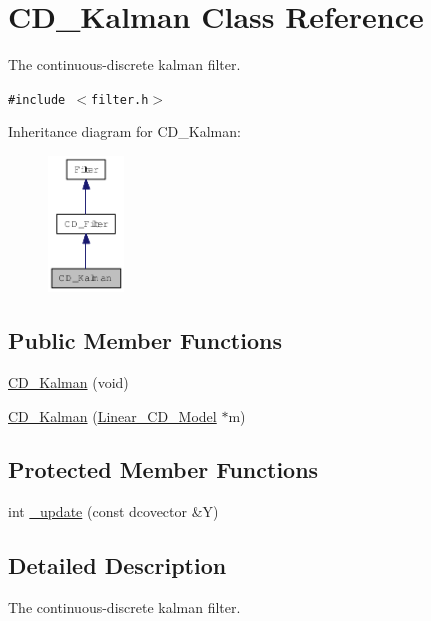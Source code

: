 \hypertarget{class_c_d___kalman}{
\section{CD\_\-Kalman Class Reference}
\label{class_c_d___kalman}
}
The continuous-discrete kalman filter.  


{\tt \#include $<$filter.h$>$}

Inheritance diagram for CD\_\-Kalman:\nopagebreak
\begin{figure}[H]
\begin{center}
\leavevmode
\includegraphics[width=57pt]{class_c_d___kalman__inherit__graph}
\end{center}
\end{figure}
\subsection*{Public Member Functions}
\begin{CompactItemize}
\item 
\hyperlink{class_c_d___kalman_d5d85ce755d9353740f4b9ffdf63455f}{CD\_\-Kalman} (void)
\item 
\hyperlink{class_c_d___kalman_0fd0cf5d85f0b5a820d2269bea6de350}{CD\_\-Kalman} (\hyperlink{class_linear___c_d___model}{Linear\_\-CD\_\-Model} $\ast$m)
\end{CompactItemize}
\subsection*{Protected Member Functions}
\begin{CompactItemize}
\item 
int \hyperlink{class_c_d___kalman_ecef658eac67b1005d9e86ec30708300}{\_\-update} (const dcovector \&Y)
\end{CompactItemize}


\subsection{Detailed Description}
The continuous-discrete kalman filter. 

